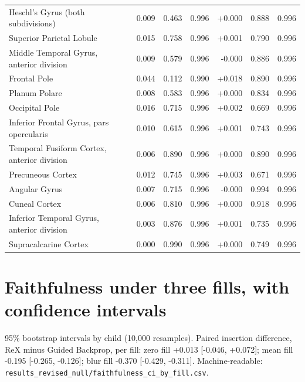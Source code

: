 \documentclass[11pt]{article}
\begin{document}
{\begin{longtable}{>{\raggedright\arraybackslash}p{6.4cm}rrrrrr}
Heschl's Gyrus (both subdivisions) & 0.009 & 0.463 & 0.996 & +0.000 & 0.888 & 0.996 \\
Superior Parietal Lobule & 0.015 & 0.758 & 0.996 & +0.001 & 0.790 & 0.996 \\
Middle Temporal Gyrus, anterior division & 0.009 & 0.579 & 0.996 & -0.000 & 0.886 & 0.996 \\
Frontal Pole & 0.044 & 0.112 & 0.990 & +0.018 & 0.890 & 0.996 \\
Planum Polare & 0.008 & 0.583 & 0.996 & +0.000 & 0.834 & 0.996 \\
Occipital Pole & 0.016 & 0.715 & 0.996 & +0.002 & 0.669 & 0.996 \\
Inferior Frontal Gyrus, pars opercularis & 0.010 & 0.615 & 0.996 & +0.001 & 0.743 & 0.996 \\
Temporal Fusiform Cortex, anterior division & 0.006 & 0.890 & 0.996 & +0.000 & 0.890 & 0.996 \\
Precuneous Cortex & 0.012 & 0.745 & 0.996 & +0.003 & 0.671 & 0.996 \\
Angular Gyrus & 0.007 & 0.715 & 0.996 & -0.000 & 0.994 & 0.996 \\
Cuneal Cortex & 0.006 & 0.810 & 0.996 & +0.000 & 0.918 & 0.996 \\
Inferior Temporal Gyrus, anterior division & 0.003 & 0.876 & 0.996 & +0.001 & 0.735 & 0.996 \\
Supracalcarine Cortex & 0.000 & 0.990 & 0.996 & +0.000 & 0.749 & 0.996 \\
\end{longtable}

}


\section{Faithfulness under three fills, with confidence intervals}
\label{app:fills}
95\% bootstrap intervals by child (10{,}000 resamples). Paired insertion difference, ReX minus Guided Backprop,
per fill: zero fill +0.013 [-0.046, +0.072];
mean fill -0.195 [-0.265, -0.126];
blur fill -0.370 [-0.429, -0.311].
Machine-readable: \texttt{results\_}\allowbreak\texttt{revised\_null/faithfulness\_ci\_by\_fill.csv}.
\end{document}
